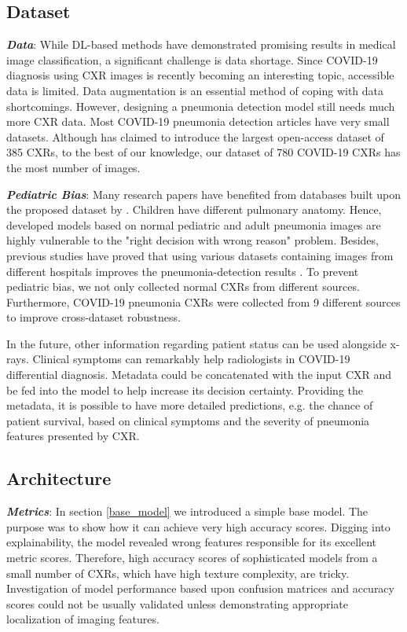 \documentclass{article}
\newcommand\numOfImages{780}
\begin{document}
\subsection{Dataset}
\textit{\textbf{Data}}: While DL-based methods have demonstrated promising results in medical image classification, a significant challenge is data shortage. Since COVID-19 diagnosis using CXR images is recently becoming an interesting topic, accessible data is limited. Data augmentation is an essential method of coping with data shortcomings. However, designing a pneumonia detection model still needs much more CXR data. Most COVID-19 pneumonia detection articles have very small datasets. Although \cite{wang2017chestx} has claimed to introduce the largest open-access dataset of 385 CXRs, to the best of our knowledge, our dataset of \numOfImages{} COVID-19 CXRs has the most number of images.





\textit{\textbf{Pediatric Bias}}: Many research papers have benefited from databases built upon the proposed dataset by \cite{kermany2018identifying}. Children have different pulmonary anatomy. Hence, developed models based on normal pediatric and adult pneumonia images are highly vulnerable to the "right decision with wrong reason" problem. Besides, previous studies have proved that using various datasets containing images from different hospitals improves the pneumonia-detection results \cite{tilve2020pneumonia}. To prevent pediatric bias, we not only collected normal CXRs from different sources. Furthermore, COVID-19 pneumonia CXRs were collected from 9 different sources to improve cross-dataset robustness.

In the future, other information regarding patient status can be used alongside x-rays. Clinical symptoms can remarkably help radiologists in COVID-19 differential diagnosis. Metadata could be concatenated with the input CXR and be fed into the model to help increase its decision certainty. Providing the metadata, it is possible to have more detailed predictions, e.g. the chance of patient survival, based on clinical symptoms and the severity of pneumonia features presented by CXR.

\subsection{Architecture}
\textit{\textbf{Metrics}}: In section \ref{base_model} we introduced a simple base model. The purpose was to show how it can achieve very high accuracy scores. Digging into explainability, the model revealed wrong features responsible for its excellent metric scores. Therefore, high accuracy scores of sophisticated models from a small number of CXRs, which have high texture complexity, are tricky. Investigation of model performance based upon confusion matrices and accuracy scores could not be usually validated unless demonstrating appropriate localization of imaging features.
\end{document}
